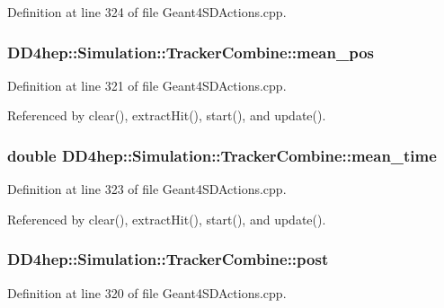 Definition at line 324 of file Geant4SDActions.cpp.\hypertarget{struct_d_d4hep_1_1_simulation_1_1_tracker_combine_a66a9636b7e0e4712718366da7db0ddf6}{
\subsubsection[{mean\_\-pos}]{ {\bf DD4hep::Simulation::TrackerCombine::mean\_\-pos}}}
\label{struct_d_d4hep_1_1_simulation_1_1_tracker_combine_a66a9636b7e0e4712718366da7db0ddf6}


Definition at line 321 of file Geant4SDActions.cpp.

Referenced by clear(), extractHit(), start(), and update().\hypertarget{struct_d_d4hep_1_1_simulation_1_1_tracker_combine_a88f539f333235ec8d8746fe11fd70e12}{
\subsubsection[{mean\_\-time}]{\setlength{\rightskip}{0pt plus 5cm}double {\bf DD4hep::Simulation::TrackerCombine::mean\_\-time}}}
\label{struct_d_d4hep_1_1_simulation_1_1_tracker_combine_a88f539f333235ec8d8746fe11fd70e12}


Definition at line 323 of file Geant4SDActions.cpp.

Referenced by clear(), extractHit(), start(), and update().\hypertarget{struct_d_d4hep_1_1_simulation_1_1_tracker_combine_a04a629d7ed0ac04fd945466a40bb7e48}{
\subsubsection[{post}]{ {\bf DD4hep::Simulation::TrackerCombine::post}}}
\label{struct_d_d4hep_1_1_simulation_1_1_tracker_combine_a04a629d7ed0ac04fd945466a40bb7e48}


Definition at line 320 of file Geant4SDActions.cpp.

